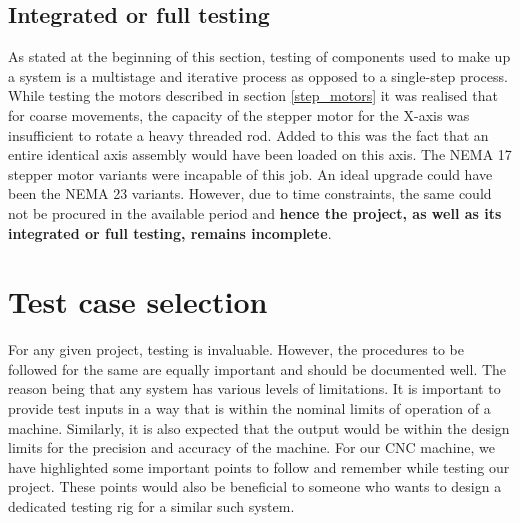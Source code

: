 \subsection{Integrated or full testing}

As stated at the beginning of this section, testing of components used to make up a system is a multistage and iterative process as opposed to a single-step process. While testing the motors described in section \ref{step_motors} it was realised that for coarse movements, the capacity of the stepper motor for the X-axis was insufficient to rotate a heavy threaded rod. Added to this was the fact that an entire identical axis assembly would have been loaded on this axis. The NEMA 17 stepper motor variants were incapable of this job. An ideal upgrade could have been the NEMA 23 variants. However, due to time constraints, the same could not be procured in the available period and \textbf{hence the project, as well as its integrated or full testing, remains incomplete}.

\section{Test case selection}

For any given project, testing is invaluable. However, the procedures to be followed for the same are equally important and should be documented well. The reason being that any system has various levels of limitations. It is important to provide test inputs in a way that is within the nominal limits of operation of a machine. Similarly, it is also expected that the output would be within the design limits for the precision and accuracy of the machine. For our CNC machine, we have highlighted some important points to follow and remember while testing our project. These points would also be beneficial to someone who wants to design a dedicated testing rig for a similar such system. \cite{online_book}

